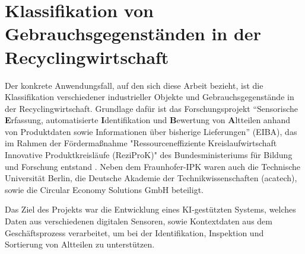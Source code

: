 \section{Klassifikation von Gebrauchsgegenständen in der Recyclingwirtschaft} \label{sec:recycling-classification} %

Der konkrete Anwendungsfall, auf den sich diese Arbeit bezieht, ist die Klassifikation verschiedener industrieller Objekte und Gebrauchsgegenstände in der Recyclingwirtschaft. Grundlage dafür ist das Forschungsprojekt “Sensorische \textbf{E}rfassung, automatisierte \textbf{I}dentifikation und \textbf{B}ewertung von \textbf{A}ltteilen anhand von Produktdaten sowie Informationen über bisherige Lieferungen” (EIBA), das im Rahmen der Fördermaßnahme "Ressourceneffiziente Kreislaufwirtschaft \textemdash Innovative Produktkreisläufe (ReziProK)" des Bundesministeriums für Bildung und Forschung entstand \parencite{Wagner2022reziprok}. Neben dem Fraunhofer-IPK waren auch die Technische Universität Berlin, die Deutsche Akademie der Technikwissenschaften (acatech), sowie die Circular Economy Solutions GmbH beteiligt.

Das Ziel des Projekts war die Entwicklung eines KI-gestützten Systems, welches Daten aus verschiedenen digitalen Sensoren, sowie Kontextdaten aus dem Geschäftsprozess verarbeitet, um bei der Identifikation, Inspektion und Sortierung von Altteilen zu unterstützen. %

